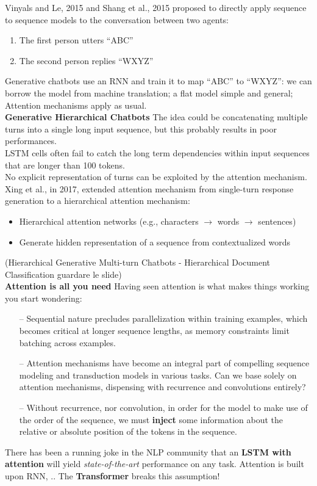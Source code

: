Vinyals and Le, 2015 and Shang et al., 2015 proposed to directly apply sequence to sequence models to the conversation between two agents:
\begin{enumerate}
    \item The first person utters “ABC”
    \item The second person replies “WXYZ”
\end{enumerate}{}

Generative chatbots use an RNN and train it to map “ABC” to “WXYZ”: we can borrow the model from machine translation; a flat model simple and general; Attention mechanisms apply as usual. \\

\textbf{Generative Hierarchical Chatbots} The idea could be concatenating multiple turns into a single long input sequence, but this probably results in poor performances. \\
LSTM cells often fail to catch the long term dependencies within input sequences that are longer than 100 tokens.\\
No explicit representation of turns can be exploited by the attention mechanism.\\

Xing et al., in 2017, extended attention mechanism from single-turn response generation to a hierarchical attention mechanism:
\begin{itemize}
    \item Hierarchical attention networks (e.g., characters $\rightarrow$ words $\rightarrow$ sentences)
    \item Generate hidden representation of a sequence from contextualized words
\end{itemize}{}

(Hierarchical Generative Multi-turn Chatbots - Hierarchical Document Classification guardare le slide) \\

\textbf{Attention is all you need} Having seen attention is what makes things working you start wondering: 
\begin{itemize}
    \item[--] Sequential nature precludes parallelization within training examples, which becomes critical at longer sequence lengths, as memory constraints limit batching across examples.
    
    \item[--]Attention mechanisms have become an integral part of compelling sequence modeling and transduction models in various tasks. Can we base solely on attention mechanisms, dispensing with recurrence and convolutions entirely?
    
    \item[--] Without recurrence, nor convolution, in order for the model to make use of the order of the sequence, we must \textbf{inject} some information about the relative or absolute position of the tokens in the sequence.
\end{itemize}{}
There has been a running joke in the NLP community that an \textbf{LSTM with attention} will yield \textit{state-of-the-art} performance on any task.
Attention is built upon RNN, .. The \textbf{Transformer} breaks this assumption!

